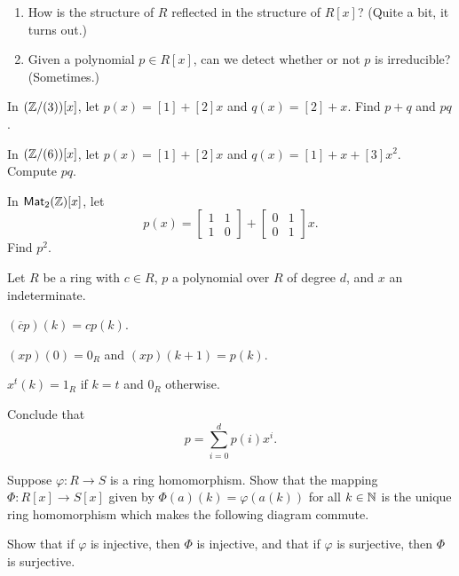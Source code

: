 \begin{framed}
\begin{enumerate}
\item How is the structure of \(R\) reflected in the structure of \(R[x]\)? (Quite a bit, it turns out.)
\item Given a polynomial \(p \in R[x]\), can we detect whether or not \(p\) is irreducible? (Sometimes.)
\end{enumerate}
\end{framed}



\Exercises%

\begin{exercise}
\begin{proplist}
\item In \((\mathbb{Z}/(3))[x]\), let \(p(x) = [1] + [2]x\) and \(q(x) = [2] + x\). Find \(p+q\) and \(pq\).
\item In \((\mathbb{Z}/(6))[x]\), let \(p(x) = [1] + [2]x\) and \(q(x) = [1] + x + [3]x^2\). Compute \(pq\).\item In \(\mathsf{Mat}_{2}(\mathbb{Z})[x]\), let \[ p(x) = \begin{bmatrix} 1 & 1 \\ 1 & 0 \end{bmatrix} + \begin{bmatrix} 0 & 1 \\ 0 & 1 \end{bmatrix} x. \] Find \(p^2\).
\end{proplist}
\end{exercise}

\begin{exercise} \label{exerc:poly-expand}
Let \(R\) be a ring with \(c \in R\), \(p\) a polynomial over \(R\) of degree \(d\), and \(x\) an indeterminate.
\begin{proplist}
\item \((\overline{c}p)(k) = cp(k)\).
\item \((xp)(0) = 0_R\) and \((xp)(k+1) = p(k)\).
\item \(x^t(k) = 1_R\) if \(k = t\) and \(0_R\) otherwise.
\item Conclude that \[ p = \sum_{i=0}^d p(i)x^i. \]
\end{proplist}
\end{exercise}

\begin{exercise}
Suppose \(\varphi : R \rightarrow S\) is a ring homomorphism. Show that the mapping \(\Phi : R[x] \rightarrow S[x]\) given by \(\Phi(a)(k) = \varphi(a(k))\) for all \(k \in \mathbb{N}\) is the unique ring homomorphism which makes the following diagram commute.
\begin{center}
\end{center}
Show that if \(\varphi\) is injective, then \(\Phi\) is injective, and that if \(\varphi\) is surjective, then \(\Phi\) is surjective.
\end{exercise}

